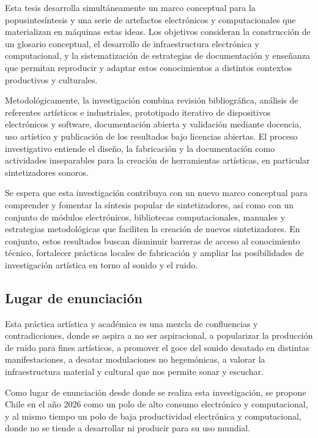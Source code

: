 \documentclass[../proyecto.tex]{subfiles}
\begin{document}

Esta tesis desarrolla simultáneamente un marco conceptual para la popusintesíntesis y una serie de artefactos electrónicos y computacionales que materializan en máquinas estas ideas. Los objetivos consideran la construcción de un glosario conceptual, el desarrollo de infraestructura electrónica y computacional, y la sistematización de estrategias de documentación y enseñanza que permitan reproducir y adaptar estos conocimientos a distintos contextos productivos y culturales.


Metodológicamente, la investigación combina revisión bibliográfica, análisis de referentes artísticos e industriales, prototipado iterativo de dispositivos electrónicos y software, documentación abierta y validación mediante docencia, uso artístico y publicación de los resultados bajo licencias abiertas. El proceso investigativo entiende el diseño, la fabricación y la documentación como actividades inseparables para la creación de herramientas artísticas, en particular sintetizadores sonoros.


Se espera que esta investigación contribuya con un nuevo marco conceptual para comprender y fomentar la síntesis popular de sintetizadores, así como con un conjunto de módulos electrónicos, bibliotecas computacionales, manuales y estrategias metodológicas que faciliten la creación de nuevos sintetizadores. En conjunto, estos resultados buscan disminuir barreras de acceso al conocimiento técnico, fortalecer prácticas locales de fabricación y ampliar las posibilidades de investigación artística en torno al sonido y el ruido.

\subsection{Lugar de enunciación}

Esta práctica artística y académica es una mezcla de confluencias y contradicciones, donde se aspira a no ser aspiracional, a popularizar la producción de ruido para fines artísticos, a promover el goce del sonido desatado en distintas manifestaciones, a desatar modulaciones no hegemónicas, a valorar la infraestructura material y cultural que nos permite sonar y escuchar.

Como lugar de enunciación desde donde se realiza esta investigación, se propone Chile en el año 2026 como un polo de alto consumo electrónico y computacional, y al mismo tiempo un polo de baja productividad electrónica y computacional, donde no se tiende a desarrollar ni producir para su uso mundial.
\end{document}
